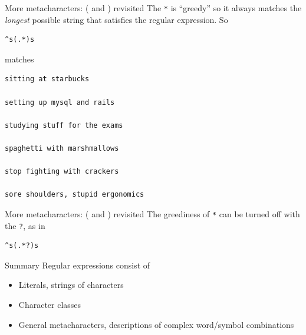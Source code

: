 \documentclass{beamer}
\begin{document}
\begin{frame}[fragile]{More metacharacters: ( and ) revisited}
The \verb+*+ is ``greedy'' so it always matches the \textit{longest}
possible string that satisfies the regular expression. So
\begin{verbatim}
^s(.*)s
\end{verbatim}
matches
\begin{verbatim}
sitting at starbucks

setting up mysql and rails

studying stuff for the exams

spaghetti with marshmallows

stop fighting with crackers

sore shoulders, stupid ergonomics
\end{verbatim}
\end{frame}

\begin{frame}[fragile]{More metacharacters: ( and ) revisited}
The greediness of \verb+*+ can be turned off with the \verb+?+, as in
\begin{verbatim}
^s(.*?)s
\end{verbatim}
\end{frame}

\begin{frame}{Summary}
Regular expressions consist of
\begin{itemize}
\item Literals, strings of characters
\item Character classes
\item General metacharacters, descriptions of complex word/symbol combinations 
\end{itemize}
\end{frame}
\end{document}
